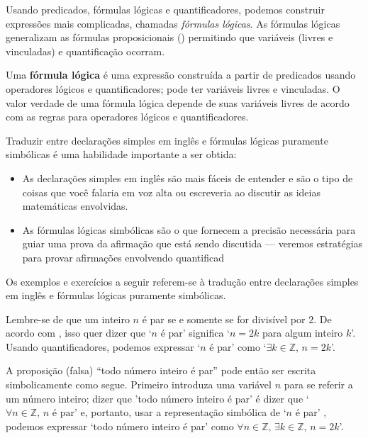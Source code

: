 Usando predicados, fórmulas lógicas e quantificadores, podemos construir expressões mais complicadas, chamadas \textit{fórmulas lógicas}. As fórmulas lógicas generalizam as fórmulas proposicionais () permitindo que variáveis ​​​​(livres e vinculadas) e quantificação ocorram.
\begin{definition}
\label{defLogicalFormula}
Uma \textbf{fórmula lógica} é uma expressão construída a partir de predicados usando operadores lógicos e quantificadores; pode ter variáveis ​​livres e vinculadas. O valor verdade de uma fórmula lógica depende de suas variáveis ​​livres de acordo com as regras para operadores lógicos e quantificadores.
\end{definition}

Traduzir entre declarações simples em inglês e fórmulas lógicas puramente simbólicas é uma habilidade importante a ser obtida:
\begin{itemize}
\item As declarações simples em inglês são mais fáceis de entender e são o tipo de coisas que você falaria em voz alta ou escreveria ao discutir as ideias matemáticas envolvidas.
\item As fórmulas lógicas simbólicas são o que fornecem a precisão necessária para guiar uma prova da afirmação que está sendo discutida --- veremos estratégias para provar afirmações envolvendo quantificad
\end{itemize}

Os exemplos e exercícios a seguir referem-se à tradução entre declarações simples em inglês e fórmulas lógicas puramente simbólicas.
\begin{example}
Lembre-se de que um inteiro $n$ é par se e somente se for divisível por $2$. De acordo com , isso quer dizer que `$n$ é par' significa `$n=2k$ para algum inteiro $k$'. Usando quantificadores, podemos expressar `$n$ é par' como `$\exists k \in \mathbb{Z},\, n=2k$'.

A proposição (falsa) “todo número inteiro é par” pode então ser escrita simbolicamente como segue. Primeiro introduza uma variável $n$ para se referir a um número inteiro; dizer que 'todo número inteiro é par' é dizer que `$\forall n \in \mathbb{Z},\, n \text{ é par}$' e, portanto, usar a representação simbólica de `$n$ é par' , podemos expressar `todo número inteiro é par' como $\forall n \in \mathbb{Z},\, \exists k \in \mathbb{Z},\, n=2k$'.
\end{example}

